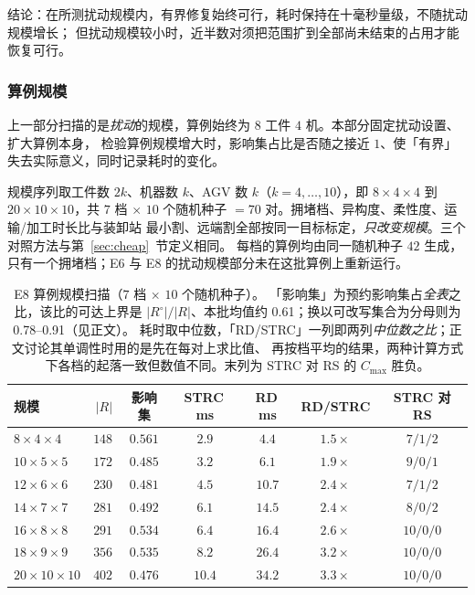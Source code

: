 \documentclass[manuscript,screen,review]{acmart}
\providecommand{\STRC}{\textsc{STRC}}
\newcommand{\NSeeds}{10}
\newcommand{\ScaleKs}{7}
\newcommand{\ScalePairs}{70}
\newcommand{\ScaleJobsHi}{20}
\newcommand{\ScaleMachHi}{10}
\newcommand{\ScaleAliveShare}{0.61}  %
\newcommand{\ScaleCloAliveLo}{0.78}  %
\newcommand{\ScaleCloAliveHi}{0.91}  %
\begin{document}
结论：在所测扰动规模内，有界修复始终可行，耗时保持在十毫秒量级，不随扰动规模增长；
但扰动规模较小时，近半数对须把范围扩到全部尚未结束的占用才能恢复可行。

\subsubsection{算例规模}
\label{sec:instscale}

上一部分扫描的是\emph{扰动}的规模，算例始终为 \(8\) 工件 \(4\) 机。本部分固定扰动设置、扩大算例本身，
检验算例规模增大时，影响集占比是否随之接近 \(1\)、使「有界」失去实际意义，同时记录耗时的变化。

规模序列取工件数 \(2k\)、机器数 \(k\)、AGV 数 \(k\)（\(k=4,\dots,10\)），即 \(8\times4\times4\) 到
\(\ScaleJobsHi\times\ScaleMachHi\times\ScaleMachHi\)，共 \(\ScaleKs\) 档 \(\times\)
\(\NSeeds\) 个随机种子 \(=\ScalePairs\) 对。拥堵档、异构度、柔性度、运输/加工时长比与装卸站
最小割、远端割全部按同一目标标定，\emph{只改变规模}。三个对照方法与第~\ref{sec:cheap}~节定义相同。
每档的算例均由同一随机种子 \(42\) 生成，只有一个拥堵档；E6 与 E8 的扰动规模部分未在这批算例上重新运行。

\begin{table}[t]
\centering
\caption{E8 算例规模扫描（\(\ScaleKs\) 档 \(\times\) \(\NSeeds\) 个随机种子）。
「影响集」为预约影响集占\emph{全表}之比，该比的可达上界是 \(|R^{\circ}|/|R|\)、本批均值约
\ScaleAliveShare；换以可改写集合为分母则为 \ScaleCloAliveLo--\ScaleCloAliveHi（见正文）。
耗时取中位数，「RD/\STRC{}」一列即两列\emph{中位数之比}；正文讨论其单调性时用的是先在每对上求比值、
再按档平均的结果，两种计算方式下各档的起落一致但数值不同。末列为 \STRC{} 对 RS 的 \(C_{\max}\) 胜负。}
\label{tab:instscale}
\small
\begin{tabular}{@{}lrccccc@{}}
\toprule
规模 & \(|R|\) & 影响集 & \STRC{}\,ms & RD\,ms & RD/\STRC{} & \STRC{} 对 RS \\
\midrule
\(8\times4\times4\)    & \(148\) & \(0.561\) & \(2.9\)  & \(4.4\)  & \(1.5\times\) & \(7/1/2\) \\
\(10\times5\times5\)   & \(172\) & \(0.485\) & \(3.2\)  & \(6.1\)  & \(1.9\times\) & \(9/0/1\) \\
\(12\times6\times6\)   & \(230\) & \(0.481\) & \(4.5\)  & \(10.7\) & \(2.4\times\) & \(7/1/2\) \\
\(14\times7\times7\)   & \(281\) & \(0.492\) & \(6.1\)  & \(14.5\) & \(2.4\times\) & \(8/0/2\) \\
\(16\times8\times8\)   & \(291\) & \(0.534\) & \(6.4\)  & \(16.4\) & \(2.6\times\) & \(10/0/0\) \\
\(18\times9\times9\)   & \(356\) & \(0.535\) & \(8.2\)  & \(26.4\) & \(3.2\times\) & \(10/0/0\) \\
\(20\times10\times10\) & \(402\) & \(0.476\) & \(10.4\) & \(34.2\) & \(3.3\times\) & \(10/0/0\) \\
\bottomrule
\end{tabular}
\end{table}
\end{document}
